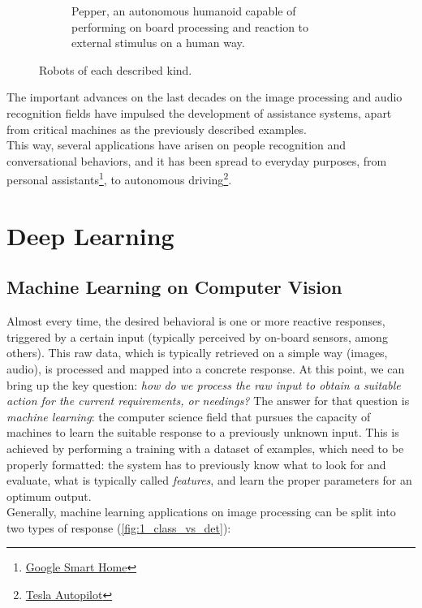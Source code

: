 \begin{figure}[h]
\begin{subfigure}[b]{0.4\textwidth}
			\caption{Pepper, an autonomous humanoid capable of performing on board processing and reaction to external stimulus on a human way.}
			\label{fig:1_pepper}
		\end{subfigure}
		\caption{Robots of each described kind.}
		\label{fig:1_robots}
		
	\end{figure}

The important advances on the last decades on the image processing and audio recognition fields have impulsed the development of assistance systems, apart from critical machines as the previously described examples. \\

This way, several applications have arisen on people recognition and conversational behaviors, and it has been spread to everyday purposes, from personal assistants\footnote{\href{https://www.standard.co.uk/tech/google-smart-home-future-stay-a3868591.html}{Google Smart Home}}, to autonomous driving\footnote{\href{https://electrek.co/2018/06/18/what-tesla-autopilot-see-understand/}{Tesla Autopilot}}.\\


\section{Deep Learning}
\subsection{Machine Learning on Computer Vision}
Almost every time, the desired behavioral is one or more reactive responses, triggered by a certain input (typically perceived by on-board sensors, among others). This raw data, which is typically retrieved on a simple way (images, audio), is processed and mapped into a concrete response. At this point, we can bring up the key question: \emph{how do we process the raw input to obtain a suitable action for the current requirements, or needings?} The answer for that question is \textit{machine learning}: the computer science field that pursues the capacity of machines to learn the suitable response to a previously unknown input. This is achieved by performing a training with a dataset of examples, which need to be properly formatted: the system has to previously know what to look for and evaluate, what is typically called \textit{features}, and learn the proper parameters for an optimum output.\\

Generally, machine learning applications on image processing can be split into two types of response (\autoref{fig:1_class_vs_det}):

